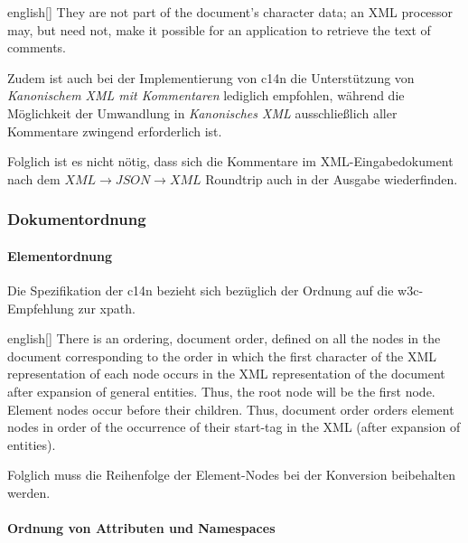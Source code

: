\begin{foreigndisplayquote}{english}[{\cite[Abschnitt~2.5]{maler2008xml}}]
They are not part of the document's character data; an XML processor may, but need not, make it possible for an application to retrieve the text of comments.
\end{foreigndisplayquote}

Zudem ist auch bei der Implementierung von \acrlong{c14n} die Unterstützung von \emph{Kanonischem XML mit Kommentaren} lediglich empfohlen, während die Möglichkeit der Umwandlung in \emph{Kanonisches XML} ausschließlich aller Kommentare zwingend erforderlich ist.\cite[Abschnitt~2.1]{boyer2001c14n}

Folglich ist es nicht nötig, dass sich die Kommentare im XML-Eingabedokument nach dem $XML\rightarrow{}JSON\rightarrow{}XML$ Roundtrip auch in der Ausgabe wiederfinden.

\subsubsection{Dokumentordnung}

\paragraph{Elementordnung}

Die Spezifikation der \acrshort{c14n} bezieht sich bezüglich der Ordnung auf die \acrshort{w3c}-Empfehlung zur \acrfull{xpath}\cite[Abschnitt~2.2]{boyer2001c14n}.

\begin{foreigndisplayquote}{english}[{\cite[Abschnitt~5]{clark1999xpath1}}]
There is an ordering, document order, defined on all the nodes in the document corresponding to the order in which the first character of the XML representation of each node occurs in the XML representation of the document after expansion of general entities. Thus, the root node will be the first node. Element nodes occur before their children. Thus, document order orders element nodes in order of the occurrence of their start-tag in the XML (after expansion of entities).
\end{foreigndisplayquote}

Folglich muss die Reihenfolge der Element-Nodes bei der Konversion beibehalten werden.

\paragraph{Ordnung von Attributen und Namespaces}

